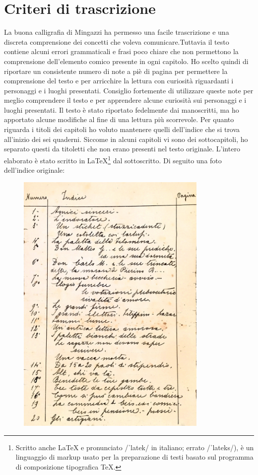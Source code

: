 \thispagestyle{empty}
\chapter*{Criteri di trascrizione}
La buona calligrafia di Mingazzi ha permesso una facile trascrizione e una discreta comprensione dei concetti che voleva comunicare.\:Tuttavia il testo contiene alcuni errori grammaticali e frasi poco chiare che non permettono la comprensione dell'elemento comico presente in ogni capitolo. Ho scelto quindi di riportare un consistente numero di note a piè di pagina per permettere la comprensione del testo e per arricchire la lettura con curiosità riguardanti i personaggi e i luoghi presentati. Consiglio fortemente di utilizzare queste note per meglio comprendere il testo e per apprendere alcune curiosità sui personaggi e i luoghi presentati. Il testo è stato riportato fedelmente dai manoscritti, ma ho apportato alcune modifiche al fine di una lettura più scorrevole. Per quanto riguarda i titoli dei capitoli ho voluto mantenere quelli dell'indice che si trova all'inizio dei sei quaderni. Siccome in alcuni capitoli vi sono dei sottocapitoli, ho separato questi da titoletti che non erano presenti nel testo originale. L'intero elaborato è stato scritto in \LaTeX\footnote{Scritto anche \LaTeX \: e pronunciato /ˈlatek/ in italiano; errato /ˈlateks/), è un linguaggio di markup usato per la preparazione di testi basato sul programma di composizione tipografica \TeX.} \:dal sottoscritto.\newpage
\noindent Di seguito una foto dell'indice originale:\\
 \begin{figure}[htb]
    \centering
    \vspace{-0.7cm}
    \includegraphics[height=13cm]{indice}
\end{figure}
